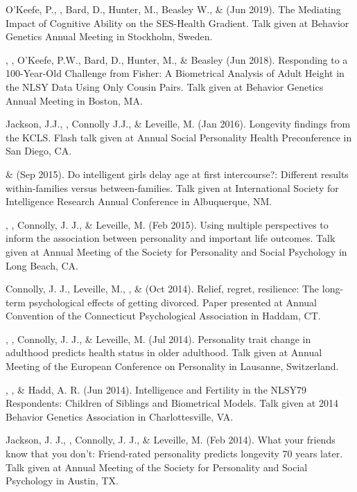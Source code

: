 \begin{etaremune}
%
\item O'Keefe, P., \meb, Bard, D., Hunter, M.,  Beasley W.,  \&  \Joe (Jun 2019). The Mediating Impact of Cognitive Ability on the SES-Health Gradient. Talk given at Behavior Genetics Annual Meeting in Stockholm, Sweden. 
%
\item\Joe, \meb, O'Keefe, P.W., Bard, D., Hunter, M., \& Beasley (Jun 2018). Responding to a 100-Year-Old Challenge from Fisher: A Biometrical Analysis of Adult Height in the NLSY Data Using Only Cousin Pairs. Talk given at Behavior Genetics Annual Meeting in Boston, MA. 

\item Jackson, J.J., \meb, Connolly J.J., \& Leveille, M. (Jan 2016). Longevity findings from the KCLS. Flash talk given at Annual Social Personality Health Preconference in San Diego, CA. %
%
\item \joe \& \meb (Sep 2015). Do intelligent girls delay age at first intercourse?: Different results within-families versus between-families. Talk given at International Society for Intelligence Research Annual Conference in Albuquerque, NM.

\item \jjj, \meb, Connolly, J. J., \& Leveille, M. (Feb 2015). Using multiple perspectives to inform the association between personality and important life outcomes. Talk given at Annual Meeting of the Society for Personality and Social Psychology in Long Beach, CA.
%
\item Connolly, J. J., Leveille, M., \meb, \& \jjj (Oct 2014). Relief, regret, resilience: The long-term psychological effects of getting divorced. Paper presented at Annual Convention of the Connecticut Psychological Association in Haddam, CT.
%
\item \jjj, \meb, Connolly, J. J., \& Leveille, M. (Jul 2014). Personality trait change in adulthood predicts health status in older adulthood. Talk given at Annual Meeting of the European Conference on Personality in Lausanne, Switzerland.
%
\item \joe, \meb, \& Hadd, A. R. (Jun 2014). Intelligence and Fertility in the NLSY79 Respondents: Children of Siblings and Biometrical Models. Talk given at 2014 Behavior Genetics Association in Charlottesville, VA.

\item Jackson, J. J., \meb, Connolly, J. J., \& Leveille, M. (Feb 2014). What your friends know that you don't: Friend-rated personality predicts longevity 70 years later. Talk given at Annual Meeting of the Society for Personality and Social Psychology in Austin, TX.
\end{etaremune}
